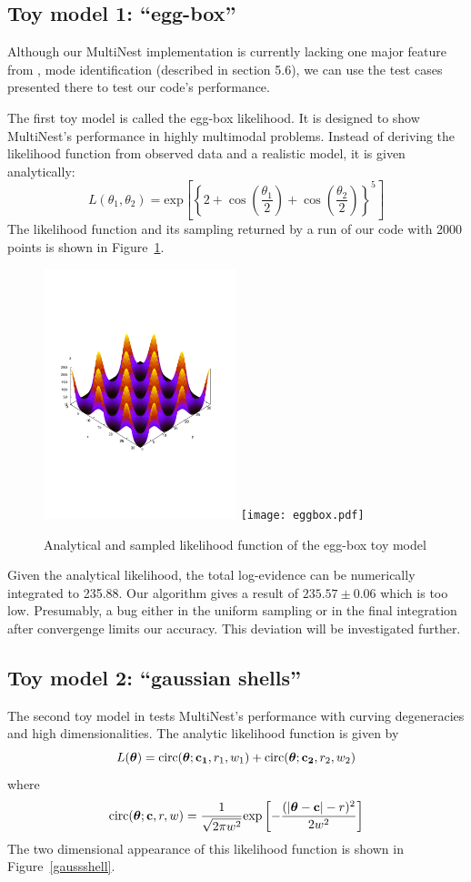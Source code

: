\documentclass{article}
\begin{document}
\subsection{Toy model 1: ``egg-box''}
Although our MultiNest implementation is currently lacking one major feature from  \cite{2009MNRAS.398.1601F}, mode identification (described in section 5.6), we can use the test cases presented there to test our code's performance.

The first toy model is called the egg-box likelihood. It is designed to show MultiNest's performance in highly multimodal problems. Instead of deriving the likelihood function from observed data and a realistic model, it is given analytically:
\[L(\theta_1,\theta_2) = \mathrm{exp}
\left[\left\{2+\cos\left(\frac{\theta_1}{2}\right)+\cos\left(\frac{\theta_2}{2}\right)\right\}^5\right]\]
The likelihood function and its sampling returned by a run of our code with 2000 points is shown in Figure~\ref{eggbox}.

\begin{figure}
\includegraphics[width=0.5\textwidth]{eggbox_analytic.pdf}
\texttt{[image: eggbox.pdf]}
\caption{Analytical and sampled likelihood function of the egg-box toy model}
\label{eggbox}
\end{figure}

Given the analytical likelihood, the total log-evidence can be numerically integrated to 235.88. Our algorithm gives a result of $235.57\pm 0.06$ which is too low. Presumably, a bug either in the uniform sampling or in the final integration after convergenge limits our accuracy. This deviation will be investigated further.

\subsection{Toy model 2: ``gaussian shells''}
The second toy model in \cite{2009MNRAS.398.1601F} tests MultiNest's performance with curving degeneracies and high dimensionalities. The analytic likelihood function is given by
\[L(\mbox{\boldmath$\theta$}) = \mathrm{circ}(\mbox{\boldmath$\theta$};{\bf c_1},r_1,w_1)
+\mathrm{circ}(\mbox{\boldmath$\theta$};{\bf c_2},r_2,w_2)\]
where
\[ \mathrm{circ}(\mbox{\boldmath$\theta$};{\bf c},r,w) = \frac{1}{\sqrt{2\pi w^2}}\mathrm{exp}\left[-\frac{(|\mbox{\boldmath$\theta$} 
- {\bf c}|-r)^2}{2w^2}\right]\]
The two dimensional appearance of this likelihood function is shown in Figure~\ref{gaussshell}.
\end{document}
